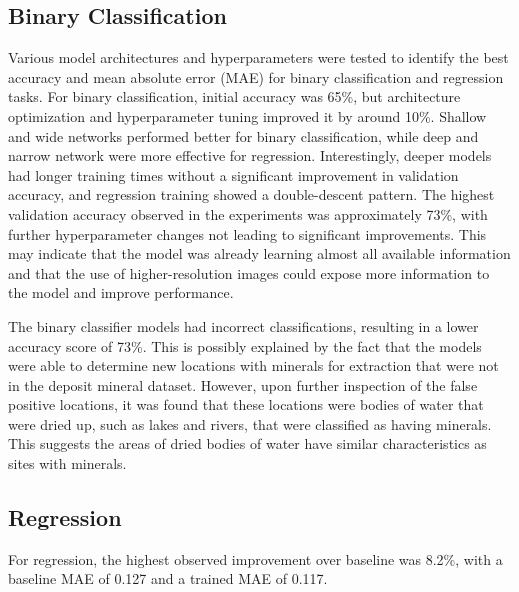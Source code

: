 \documentclass[10pt]{article}
\begin{document}

\subsection{Binary Classification}


Various model architectures and hyperparameters were tested to identify the best accuracy and
mean absolute error (MAE) for binary classification and regression tasks. For binary classification,
initial accuracy was 65\%, but architecture optimization and hyperparameter tuning improved it by around 10\%.
Shallow and wide networks performed better for binary classification, while deep and narrow network
were more effective for regression. Interestingly, deeper models had longer training times without
a significant improvement in validation accuracy, and regression training showed a double-descent pattern.
The highest validation accuracy observed in the experiments was approximately 73\%, with further
hyperparameter changes not leading to significant improvements. This may indicate that the model was
already learning almost all available information and that the use of higher-resolution images
could expose more information to the model and improve performance.

The binary classifier models had incorrect classifications, resulting in a lower accuracy score of 73\%.
This is possibly explained by the fact that the models were able to determine new locations with minerals
for extraction that were not in the deposit mineral dataset. However, upon further inspection of the
false positive locations, it was found that these locations were bodies of water that were dried up,
such as lakes and rivers, that were classified as having minerals. This suggests the areas of dried
bodies of water have similar characteristics as sites with minerals.

\subsection{Regression}



For regression, the highest observed improvement over baseline was 8.2\%, with a baseline MAE of 0.127 and a trained MAE of 0.117.
\end{document}
